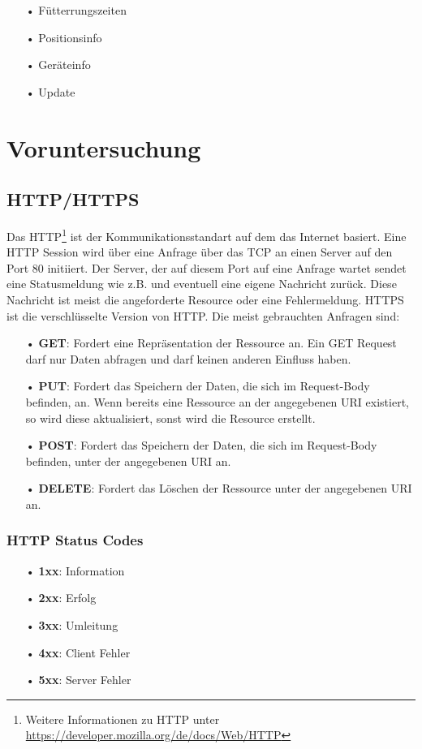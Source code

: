 \begin{itemize}
\item[•]Fütterrungszeiten
\item[•]Positionsinfo
\item[•]Geräteinfo
\item[•]Update
\end{itemize}

\section{Voruntersuchung}
\label{sec:voruntersuchung}

\subsection{HTTP/HTTPS}
\label{sec:vor-http}
Das \ac{HTTP}\footnote{Weitere Informationen zu \ac{HTTP} unter \url{https://developer.mozilla.org/de/docs/Web/HTTP}} ist der Kommunikationsstandart auf dem das Internet basiert. Eine HTTP Session wird über eine Anfrage über das \ac{TCP} an einen Server auf den Port 80 initiiert. Der Server, der auf diesem Port auf eine Anfrage wartet sendet eine Statusmeldung wie z.B.  und eventuell eine eigene Nachricht zurück. Diese Nachricht ist meist die angeforderte Resource oder eine Fehlermeldung. \ac{HTTPS} ist die verschlüsselte Version von \ac{HTTP}. Die meist gebrauchten Anfragen sind:

\begin{itemize}
\item[•] \textbf{GET}: Fordert eine Repräsentation der Ressource an. Ein GET Request darf nur Daten abfragen und darf keinen anderen Einfluss haben.
\item[•] \textbf{PUT}: Fordert das Speichern der Daten, die sich im Request-Body befinden, an. Wenn bereits eine Ressource an der angegebenen \ac{URI} existiert, so wird diese aktualisiert, sonst wird die Resource erstellt.
\item[•] \textbf{POST}: Fordert das Speichern der Daten, die sich im Request-Body befinden, unter der angegebenen \ac{URI} an. 
\item[•] \textbf{DELETE}: Fordert das Löschen der Ressource unter der angegebenen \ac{URI} an.
\end{itemize}

\subsubsection{HTTP Status Codes}
\label{sec:http-status-codes}
\begin{itemize}
\item[•] \textbf{1xx}: Information
\item[•] \textbf{2xx}: Erfolg
\item[•] \textbf{3xx}: Umleitung
\item[•] \textbf{4xx}: Client Fehler
\item[•] \textbf{5xx}: Server Fehler
\end{itemize}


